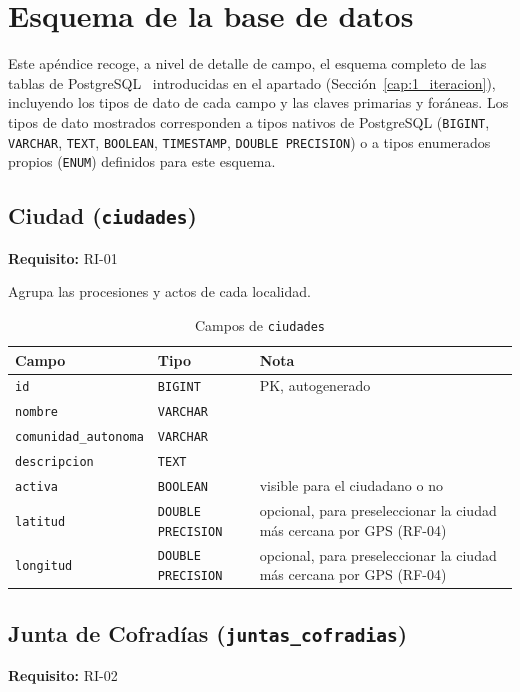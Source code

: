 \chapter{Esquema de la base de datos}\label{cap:esquemaBD}

Este apéndice recoge, a nivel de detalle de campo, el esquema completo de las tablas de PostgreSQL~\cite{postgresql} introducidas en el apartado  (Sección~\ref{cap:1_iteracion}), incluyendo los tipos de dato de cada campo y las claves primarias y foráneas. Los tipos de dato mostrados corresponden a tipos nativos de PostgreSQL (\texttt{BIGINT}, \texttt{VARCHAR}, \texttt{TEXT}, \texttt{BOOLEAN}, \texttt{TIMESTAMP}, \texttt{DOUBLE PRECISION}) o a tipos enumerados propios (\texttt{ENUM}) definidos para este esquema.

\section{Ciudad (\texttt{ciudades})}
\textbf{Requisito:} RI-01

Agrupa las procesiones y actos de cada localidad.

\begin{table}[H]
\centering
\begin{tabular}{|l|l|p{7cm}|}
\hline
\textbf{Campo} & \textbf{Tipo} & \textbf{Nota} \\
\hline
\texttt{id} & \texttt{BIGINT} & PK, autogenerado \\
\hline
\texttt{nombre} & \texttt{VARCHAR} &  \\
\hline
\texttt{comunidad\_autonoma} & \texttt{VARCHAR} &  \\
\hline
\texttt{descripcion} & \texttt{TEXT} &  \\
\hline
\texttt{activa} & \texttt{BOOLEAN} & visible para el ciudadano o no \\
\hline
\texttt{latitud} & \texttt{DOUBLE PRECISION} & opcional, para preseleccionar la ciudad más cercana por GPS (RF-04) \\
\hline
\texttt{longitud} & \texttt{DOUBLE PRECISION} & opcional, para preseleccionar la ciudad más cercana por GPS (RF-04) \\
\hline
\end{tabular}
\caption{Campos de \texttt{ciudades}}
\end{table}

\section{Junta de Cofradías (\texttt{juntas\_cofradias})}
\textbf{Requisito:} RI-02

